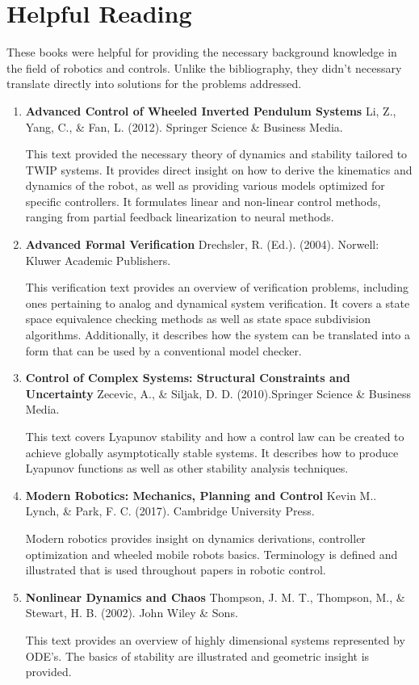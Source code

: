 \chapter{Helpful Reading}

These books were helpful for providing the necessary background knowledge in the field of robotics and controls. Unlike the bibliography, they didn't necessary translate directly into solutions for the problems addressed.

\begin{enumerate}
    \item \textbf{Advanced Control of Wheeled Inverted Pendulum Systems} Li, Z., Yang, C., & Fan, L. (2012). Springer Science & Business Media.
    
    This text provided the necessary theory of dynamics and stability tailored to TWIP systems. It provides direct insight on how to derive the kinematics and dynamics of the robot, as well as providing various models optimized for specific controllers. It formulates linear and non-linear control methods, ranging from partial feedback linearization to neural methods. 
    
    
    \item \textbf{Advanced Formal Verification} Drechsler, R. (Ed.). (2004). Norwell: Kluwer Academic Publishers.
    
    This verification text provides an overview of verification problems, including ones pertaining to analog and dynamical system verification. It covers a state space equivalence checking methods as well as state space subdivision algorithms. Additionally, it describes how the system can be translated into a form that can be used by a conventional model checker.
    
    
    \item \textbf{Control of Complex Systems: Structural Constraints and Uncertainty} Zecevic, A., & Siljak, D. D. (2010).Springer Science & Business Media.
    
    This text covers Lyapunov stability and how a control law can be created to achieve globally asymptotically stable systems. It describes how to produce Lyapunov functions as well as other stability analysis techniques.  
    
    \item \textbf{Modern Robotics: Mechanics, Planning and Control} Kevin M.. Lynch, & Park, F. C. (2017). Cambridge University Press.
    
    Modern robotics provides insight on dynamics derivations, controller optimization and wheeled mobile robots basics. Terminology is defined and illustrated that is used throughout papers in robotic control.  
    
    \item \textbf{Nonlinear Dynamics and Chaos} Thompson, J. M. T., Thompson, M., & Stewart, H. B. (2002). John Wiley & Sons.
    
    This text provides an overview of highly dimensional systems represented by ODE's. The basics of stability are illustrated and geometric insight is provided. 
    
    
    
\end{enumerate}